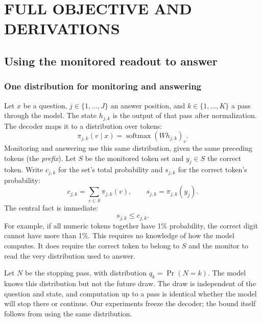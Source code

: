 \section{FULL OBJECTIVE AND DERIVATIONS}\label{app:theory}
\subsection{Using the monitored readout to answer}
\subsubsection{One distribution for monitoring and answering}
Let $x$ be a question, $j\in\{1,\ldots,J\}$ an answer position, and $k\in\{1,\ldots,K\}$ a pass through the model. The state $h_{j,k}$ is the output of that pass after normalization. The decoder maps it to a distribution over tokens:
\begin{equation}
 \pi_{j,k}(v\mid x)=\operatorname{softmax}(W h_{j,k})_v.
\end{equation}
Monitoring and answering use this same distribution, given the same preceding tokens (the \emph{prefix}). Let $S$ be the monitored token set and $y_j\in S$ the correct token. Write $c_{j,k}$ for the set's total probability and $s_{j,k}$ for the correct token's probability:
\begin{equation}
 c_{j,k}=\sum_{v\in S}\pi_{j,k}(v),\qquad s_{j,k}=\pi_{j,k}(y_j).
\end{equation}
The central fact is immediate:
\begin{equation}
 s_{j,k}\le c_{j,k}.
 \label{eq:inclusion-full}
\end{equation}
For example, if all numeric tokens together have 1\% probability, the correct digit cannot have more than 1\%. This requires no knowledge of how the model computes. It does require the correct token to belong to $S$ and the monitor to read the very distribution used to answer.

Let $N$ be the stopping pass, with distribution $q_k=\Pr(N=k)$. The model knows this distribution but not the future draw. The draw is independent of the question and state, and computation up to a pass is identical whether the model will stop there or continue. Our experiments freeze the decoder; the bound itself follows from using the same distribution.

